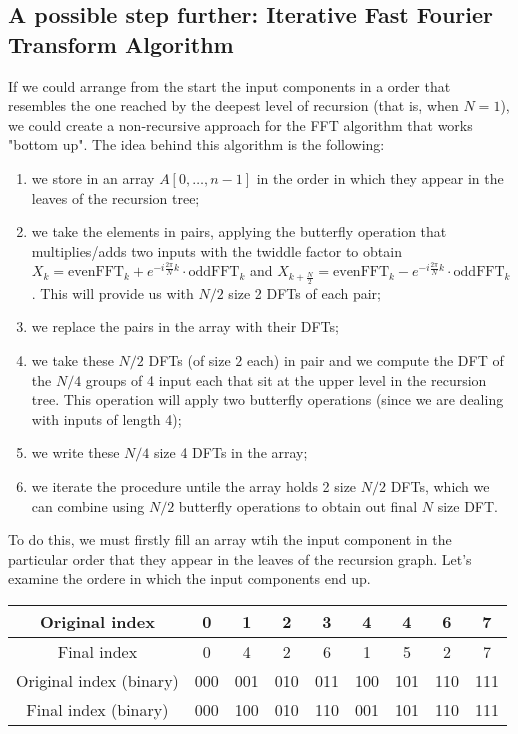 \documentclass[class=article,crop=false]{standalone}
\begin{document}
\subsection{A possible step further: Iterative Fast Fourier Transform Algorithm}
If we could arrange from the start the input components in a order that resembles the one reached by the deepest level of recursion (that is, when $N=1$), we could create a non-recursive approach for the FFT algorithm that works "bottom up". The idea behind this algorithm is the following:
\begin{enumerate}
\item we store in an array $A[0,\ldots,n-1]$ in the order in which they appear in the leaves of the recursion tree;
\item we take the elements in pairs, applying the butterfly operation that multiplies/adds two inputs with the twiddle factor to obtain $X_k=\text{evenFFT}_k+e^{-i\frac{2\pi}{N}k}\cdot \text{oddFFT}_k$ and $X_{k+\frac{N}{2}}=\text{evenFFT}_k-e^{-i\frac{2\pi}{N}k}\cdot \text{oddFFT}_k$. This will provide us with $N/2$ size 2 DFTs of each pair;
\item we replace the pairs in the array with their DFTs;
\item we take these $N/2$ DFTs (of size $2$ each) in pair and we compute the DFT of the $N/4$ groups of 4 input each that sit at the upper level in the recursion tree. This operation will apply two butterfly operations (since we are dealing with inputs of length 4);
\item we write these $N/4$ size 4 DFTs in the array;
\item we iterate the procedure untile the array holds 2 size $N/2$ DFTs, which we can combine using $N/2$ butterfly operations to obtain out final $N$ size DFT.
\end{enumerate}
To do this, we must firstly fill an array wtih the input component in the particular order that they appear in the leaves of the recursion graph. Let's examine the ordere in which the input components end up.\begin{center}
\begin{tabular}{|c| c c c c c c c c|}
    \hline
Original index &0 &1 &2 &3 &4 &4 &6 &7\\
\hline
Final index &0 &4 &2 &6 &1 &5 &2 &7\\
\hline
Original index (binary) &000 &001 &010 &011 &100 &101 &110 &111\\
\hline
Final index (binary) &000 &100 &010 &110 &001 &101 &110 &111\\
\hline
\end{tabular}\end{center}
\end{document}
